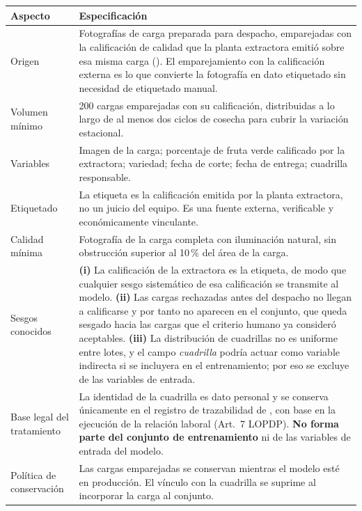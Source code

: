 \begin{table}[H]
\centering\footnotesize
\begin{tabular}{|L{3.6cm}|L{11.8cm}|}
\hline
{}\textbf{Aspecto} & \textbf{Especificación}\\ \hline
Origen & Fotografías de carga preparada para despacho, emparejadas con la calificación de calidad que la planta extractora emitió sobre esa misma carga (). El emparejamiento con la calificación externa es lo que convierte la fotografía en dato etiquetado sin necesidad de etiquetado manual.\\ \hline
Volumen mínimo & 200 cargas emparejadas con su calificación, distribuidas a lo largo de al menos dos ciclos de cosecha para cubrir la variación estacional.\\ \hline
Variables & Imagen de la carga; porcentaje de fruta verde calificado por la extractora; variedad; fecha de corte; fecha de entrega; cuadrilla responsable.\\ \hline
Etiquetado & La etiqueta es la calificación emitida por la planta extractora, no un juicio del equipo. Es una fuente externa, verificable y económicamente vinculante.\\ \hline
Calidad mínima & Fotografía de la carga completa con iluminación natural, sin obstrucción superior al 10\,\% del área de la carga.\\ \hline
Sesgos conocidos & \textbf{(i)} La calificación de la extractora es la etiqueta, de modo que cualquier sesgo sistemático de esa calificación se transmite al modelo. \textbf{(ii)} Las cargas rechazadas antes del despacho no llegan a calificarse y por tanto no aparecen en el conjunto, que queda sesgado hacia las cargas que el criterio humano ya consideró aceptables. \textbf{(iii)} La distribución de cuadrillas no es uniforme entre lotes, y el campo \emph{cuadrilla} podría actuar como variable indirecta si se incluyera en el entrenamiento; por eso se excluye de las variables de entrada.\\ \hline
Base legal del tratamiento & La identidad de la cuadrilla es dato personal y se conserva únicamente en el registro de trazabilidad de , con base en la ejecución de la relación laboral (Art.~7 LOPDP). \textbf{No forma parte del conjunto de entrenamiento} ni de las variables de entrada del modelo.\\ \hline
Política de conservación & Las cargas emparejadas se conservan mientras el modelo esté en producción. El vínculo con la cuadrilla se suprime al incorporar la carga al conjunto.\\ \hline
\end{tabular}
\end{table}

